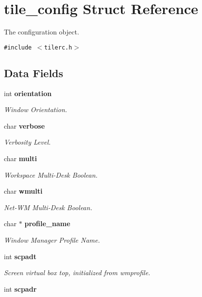 \section{tile\_\-config Struct Reference}
\label{structtile__config}
The configuration object.  


{\tt \#include $<$tilerc.h$>$}

\subsection*{Data Fields}
\begin{CompactItemize}
\item 
int {\bf orientation}
\begin{CompactList}\small\item\em Window Orientation. \item\end{CompactList}\item 
char {\bf verbose}
\begin{CompactList}\small\item\em Verbosity Level. \item\end{CompactList}\item 
char {\bf multi}
\begin{CompactList}\small\item\em Workspace Multi-Desk Boolean. \item\end{CompactList}\item 
char {\bf wmulti}
\begin{CompactList}\small\item\em Net-WM Multi-Desk Boolean. \item\end{CompactList}\item 
char $\ast$ {\bf profile\_\-name}
\begin{CompactList}\small\item\em Window Manager Profile Name. \item\end{CompactList}\item 
int {\bf scpadt}
\begin{CompactList}\small\item\em Screen virtual box top, initialized from wmprofile. \item\end{CompactList}\item 
int {\bf scpadr}

\end{CompactItemize}
